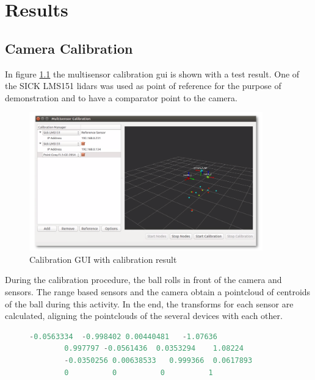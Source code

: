 \chapter{Results}

\section{Camera Calibration}

In figure \ref{fig:gui} the multisensor calibration \gls{gui} is shown with a test result. One of the SICK LMS151 \gls{lidar}s was used as point of reference for the purpose of demonstration and to have a comparator point to the camera.
\begin{figure}[htp]
	
	\centering
	\includegraphics[width=0.9\textwidth]{capresults/imgs/gui.png}
	
	\caption{Calibration GUI with calibration result}
	\label{fig:gui}
	
\end{figure}

During the calibration procedure, the ball rolls in front of the camera and sensors. The range based sensors and the camera obtain a pointcloud of centroids of the ball during this activity. In the end, the transforms for each sensor are calculated, aligning the pointclouds of the several devices with each other. 

\begin{figure}
	\begin{center}
		\begin{lstlisting}[label={lst:calib_result}, caption={Calibration output file.},language=c++]
		-0.0563334  -0.998402 0.00440481   -1.07636
		0.997797 -0.0561436  0.0353294    1.08224
		-0.0350256 0.00638533   0.999366  0.0617893
		0          0          0          1	\end{lstlisting}
	\end{center}
\end{figure}

